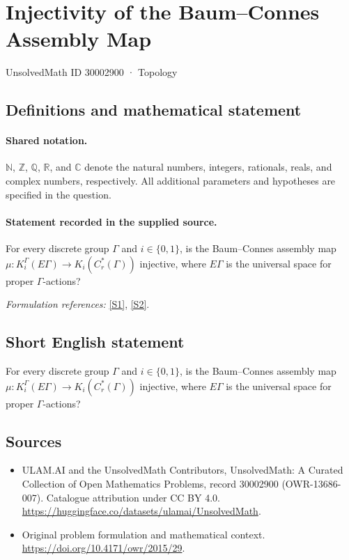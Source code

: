 \documentclass[11pt]{article}
\newcommand{\sref}[2]{\hyperlink{source:#1:#2}{[S#2]}}
\begin{document}
\setcounter{section}{30002899}
\section{Injectivity of the Baum–Connes Assembly Map}\label{30002900}
{\small UnsolvedMath ID 30002900 · Topology}
\subsection{Definitions and mathematical statement}

\paragraph{Shared notation.}$\mathbb N$, $\mathbb Z$, $\mathbb Q$, $\mathbb R$, and $\mathbb C$ denote the natural numbers, integers, rationals, reals, and complex numbers, respectively. All additional parameters and hypotheses are specified in the question.


\paragraph{Statement recorded in the supplied source.}
For every discrete group $\Gamma$ and $i\in\{0,1\}$, is the Baum–Connes assembly map $\mu:K_i^\Gamma(E\Gamma)\to K_i(C_r^*(\Gamma))$ injective, where $E\Gamma$ is the universal space for proper $\Gamma$-actions?
\par\smallskip\textit{Formulation references:} \sref{30002900}{1}, \sref{30002900}{2}.
\subsection{Short English statement}
For every discrete group $\Gamma$ and $i\in\{0,1\}$, is the Baum–Connes assembly map $\mu:K_i^\Gamma(E\Gamma)\to K_i(C_r^*(\Gamma))$ injective, where $E\Gamma$ is the universal space for proper $\Gamma$-actions?
\subsection{Sources}
\begin{itemize}
\item[\hypertarget{source:30002900:1}{S1}] ULAM.AI and the UnsolvedMath Contributors, UnsolvedMath: A Curated Collection of Open Mathematics Problems, record 30002900 (OWR-13686-007). Catalogue attribution under CC BY 4.0.
\url{https://huggingface.co/datasets/ulamai/UnsolvedMath}.
\item[\hypertarget{source:30002900:2}{S2}] Original problem formulation and mathematical context.
\url{https://doi.org/10.4171/owr/2015/29}.
\end{itemize}
\label{end:30002900}
\end{document}
